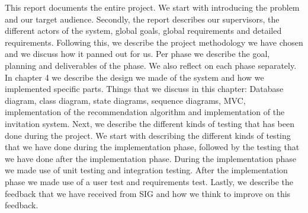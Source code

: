 This report documents the entire project.
We start with introducing the problem and our target audience.
Secondly, the report describes our supervisors, the different actors of the system, global goals, global requirements and detailed requirements.
Following this, we describe the project methodology we have chosen and we discuss how it panned out for us.
Per phase we describe the goal, planning and deliverables of the phase.
We also reflect on each phase separately.
In chapter 4 we describe the design we made of the system and how we implemented specific parts.
Things that we discuss in this chapter: Database diagram, class diagram, state diagrams, sequence diagrams, MVC, implementation of the recommendation algorithm and implementation of the invitation system.
Next, we describe the different kinds of testing that has been done during the project.
We start with describing the different kinds of testing that we have done during the implementation phase, followed by the testing that we have done after the implementation phase.
During the implementation phase we made use of unit testing and integration testing.
After the implementation phase we made use of a user test and requirements test.
Lastly, we describe the feedback that we have received from SIG and how we think to improve on this feedback.

